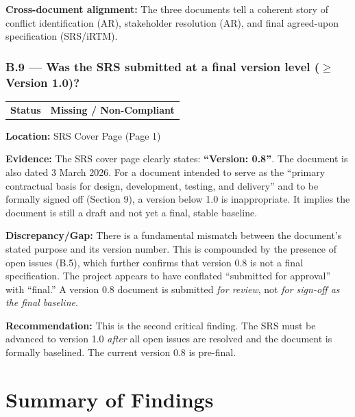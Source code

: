 \documentclass[11pt,a4paper]{article}
\begin{document}
\textbf{Cross-document alignment:} The three documents tell a coherent story of conflict identification (AR), stakeholder resolution (AR), and final agreed-upon specification (SRS/iRTM).

\vspace{0.8em}

\subsubsection*{B.9 --- Was the SRS submitted at a final version level ($\geq$ Version 1.0)?}

\begin{tabular}{p{}p{}}
\textbf{Status} & \cellcolor{critical}\textbf{Missing / Non-Compliant} \\
\end{tabular}

\textbf{Location:} SRS Cover Page (Page 1)

\textbf{Evidence:} The SRS cover page clearly states: \textbf{``Version: 0.8''}. The document is also dated 3 March 2026. For a document intended to serve as the ``primary contractual basis for design, development, testing, and delivery'' and to be formally signed off (Section 9), a version below 1.0 is inappropriate. It implies the document is still a draft and not yet a final, stable baseline.

\textbf{Discrepancy/Gap:} There is a fundamental mismatch between the document's stated purpose and its version number. This is compounded by the presence of open issues (B.5), which further confirms that version 0.8 is not a final specification. The project appears to have conflated ``submitted for approval'' with ``final.'' A version 0.8 document is submitted \textit{for review}, not \textit{for sign-off as the final baseline}.

\textbf{Recommendation:} This is the second critical finding. The SRS must be advanced to version 1.0 \textit{after} all open issues are resolved and the document is formally baselined. The current version 0.8 is pre-final.

\newpage
\section{Summary of Findings}
\end{document}
